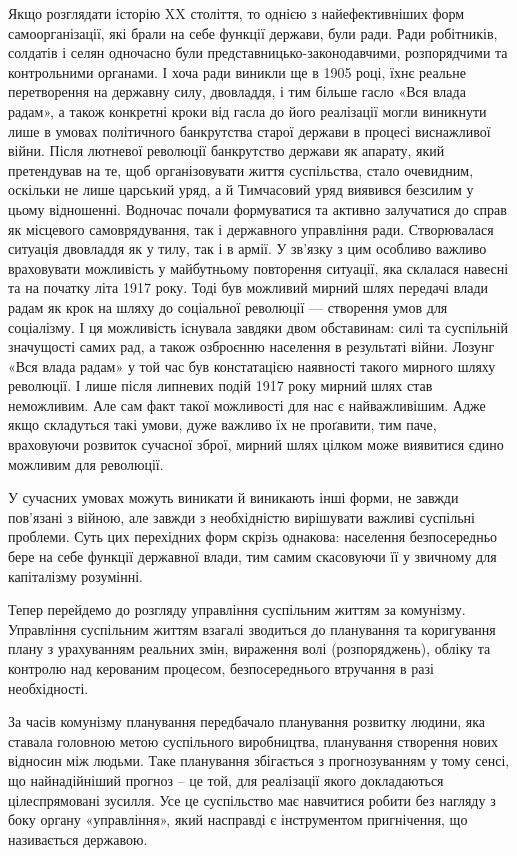 \documentclass[../main]{subfiles}
\begin{document}
Якщо розглядати історію XX століття, то однією з найефективніших форм самоорганізації, які брали на себе функції держави, були ради. Ради робітників, солдатів і селян одночасно були представницько-законодавчими, розпорядчими та контрольними органами. І хоча ради виникли ще в 1905 році, їхнє реальне перетворення на державну силу, двовладдя, і тим більше гасло «Вся влада радам», а також конкретні кроки від гасла до його реалізації могли виникнути лише в умовах політичного банкрутства старої держави в процесі виснажливої війни. Після лютневої революції банкрутство держави як апарату, який претендував на те, щоб організовувати життя суспільства, стало очевидним, оскільки не лише царський уряд, а й Тимчасовий уряд виявився безсилим у цьому відношенні. Водночас почали формуватися та активно залучатися до справ як місцевого самоврядування, так і державного управління ради. Створювалася ситуація двовладдя як у тилу, так і в армії. У зв’язку з цим особливо важливо враховувати можливість у майбутньому повторення ситуації, яка склалася навесні та на початку літа 1917 року. Тоді був можливий мирний шлях передачі влади радам як крок на шляху до соціальної революції — створення умов для соціалізму. І ця можливість існувала завдяки двом обставинам: силі та суспільній значущості самих рад, а також озброєнню населення в результаті війни. Лозунг «Вся влада радам» у той час був констатацією наявності такого мирного шляху революції. І лише після липневих подій 1917 року мирний шлях став неможливим. Але сам факт такої можливості для нас є найважливішим. Адже якщо складуться такі умови, дуже важливо їх не проґавити, тим паче, враховуючи розвиток сучасної зброї, мирний шлях цілком може виявитися єдино можливим для революції.

У сучасних умовах можуть виникати й виникають інші форми, не завжди пов’язані з війною, але завжди з необхідністю вирішувати важливі суспільні проблеми. Суть цих перехідних форм скрізь однакова: населення безпосередньо бере на себе функції державної влади, тим самим скасовуючи її у звичному для капіталізму розумінні.

Тепер перейдемо до розгляду управління суспільним життям за комунізму. Управління суспільним життям взагалі зводиться до планування та коригування плану з урахуванням реальних змін, вираження волі (розпоряджень), обліку та контролю над керованим процесом, безпосереднього втручання в разі необхідності.

За часів комунізму планування передбачало планування розвитку людини, яка ставала головною метою суспільного виробництва, планування створення нових відносин між людьми. Таке планування збігається з прогнозуванням у тому сенсі, що найнадійніший прогноз – це той, для реалізації якого докладаються цілеспрямовані зусилля. Усе це суспільство має навчитися робити без нагляду з боку органу «управління», який насправді є інструментом пригнічення, що називається державою.
\end{document}
